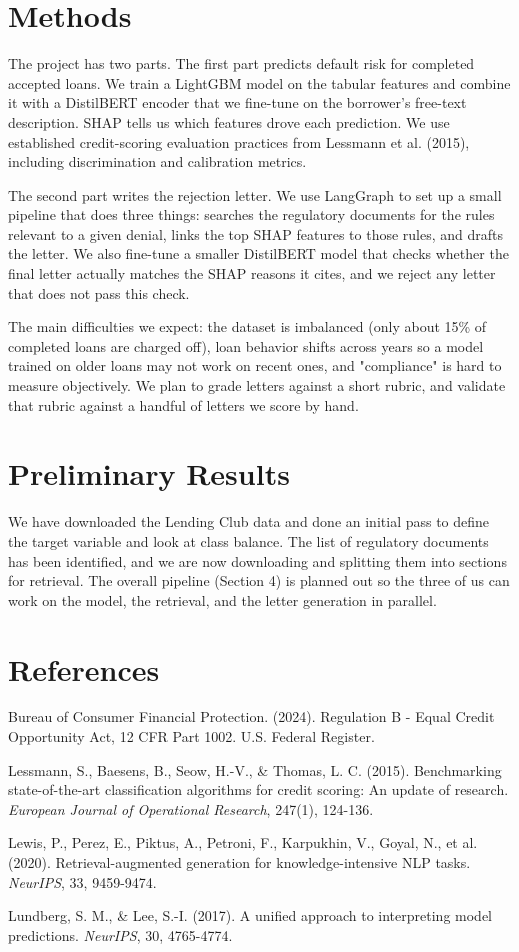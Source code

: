 \documentclass[11pt]{article}
\begin{document}
\section{Methods}
The project has two parts. The first part predicts default risk for completed accepted loans. We train a LightGBM model on the tabular features and combine it with a DistilBERT encoder that we fine-tune on the borrower's free-text description. SHAP tells us which features drove each prediction. We use established credit-scoring evaluation practices from Lessmann et al. (2015), including discrimination and calibration metrics.

The second part writes the rejection letter. We use LangGraph to set up a small pipeline that does three things: searches the regulatory documents for the rules relevant to a given denial, links the top SHAP features to those rules, and drafts the letter. We also fine-tune a smaller DistilBERT model that checks whether the final letter actually matches the SHAP reasons it cites, and we reject any letter that does not pass this check.

The main difficulties we expect: the dataset is imbalanced (only about 15\% of completed loans are charged off), loan behavior shifts across years so a model trained on older loans may not work on recent ones, and "compliance" is hard to measure objectively. We plan to grade letters against a short rubric, and validate that rubric against a handful of letters we score by hand.

\section{Preliminary Results}
We have downloaded the Lending Club data and done an initial pass to define the target variable and look at class balance. The list of regulatory documents has been identified, and we are now downloading and splitting them into sections for retrieval. The overall pipeline (Section 4) is planned out so the three of us can work on the model, the retrieval, and the letter generation in parallel.

\section{References}
\small
Bureau of Consumer Financial Protection. (2024). Regulation B - Equal Credit Opportunity Act, 12 CFR Part 1002. U.S. Federal Register.

Lessmann, S., Baesens, B., Seow, H.-V., \& Thomas, L. C. (2015). Benchmarking state-of-the-art classification algorithms for credit scoring: An update of research. \textit{European Journal of Operational Research}, 247(1), 124-136.

Lewis, P., Perez, E., Piktus, A., Petroni, F., Karpukhin, V., Goyal, N., et al. (2020). Retrieval-augmented generation for knowledge-intensive NLP tasks. \textit{NeurIPS}, 33, 9459-9474.

Lundberg, S. M., \& Lee, S.-I. (2017). A unified approach to interpreting model predictions. \textit{NeurIPS}, 30, 4765-4774.
\end{document}
